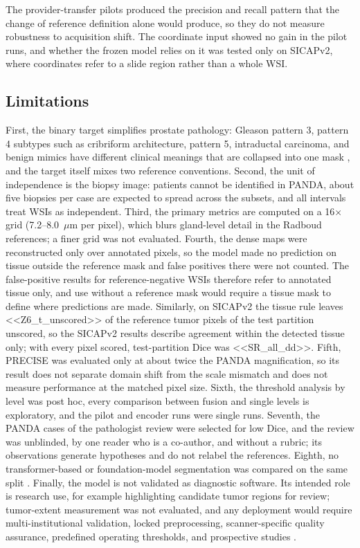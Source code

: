 \documentclass[10pt,letterpaper]{article}
\begin{document}
The provider-transfer pilots produced the precision and recall pattern that the change of reference definition alone would produce, so they do not measure robustness to acquisition shift. The coordinate input showed no gain in the pilot runs, and whether the frozen model relies on it was tested only on SICAPv2, where coordinates refer to a slide region rather than a whole WSI.

\subsection*{Limitations}
First, the binary target simplifies prostate pathology: Gleason pattern 3, pattern 4 subtypes such as cribriform architecture, pattern 5, intraductal carcinoma, and benign mimics have different clinical meanings that are collapsed into one mask \cite{bib3,bib4,bib5}, and the target itself mixes two reference conventions. Second, the unit of independence is the biopsy image: patients cannot be identified in PANDA, about five biopsies per case are expected to spread across the subsets, and all intervals treat WSIs as independent. Third, the primary metrics are computed on a 16$\times$ grid (7.2--8.0~$\mu$m per pixel), which blurs gland-level detail in the Radboud references; a finer grid was not evaluated. Fourth, the dense maps were reconstructed only over annotated pixels, so the model made no prediction on tissue outside the reference mask and false positives there were not counted. The false-positive results for reference-negative WSIs therefore refer to annotated tissue only, and use without a reference mask would require a tissue mask to define where predictions are made. Similarly, on SICAPv2 the tissue rule leaves <<Z6_t_unscored>> of the reference tumor pixels of the test partition unscored, so the SICAPv2 results describe agreement within the detected tissue only; with every pixel scored, test-partition Dice was <<SR_all_dd>>. Fifth, PRECISE was evaluated only at about twice the PANDA magnification, so its result does not separate domain shift from the scale mismatch and does not measure performance at the matched pixel size. Sixth, the threshold analysis by level was post hoc, every comparison between fusion and single levels is exploratory, and the pilot and encoder runs were single runs. Seventh, the PANDA cases of the pathologist review were selected for low Dice, and the review was unblinded, by one reader who is a co-author, and without a rubric; its observations generate hypotheses and do not relabel the references. Eighth, no transformer-based or foundation-model segmentation was compared on the same split \cite{bib48,bib49,bib50,bib57,bib58}. Finally, the model is not validated as diagnostic software. Its intended role is research use, for example highlighting candidate tumor regions for review; tumor-extent measurement was not evaluated, and any deployment would require multi-institutional validation, locked preprocessing, scanner-specific quality assurance, predefined operating thresholds, and prospective studies \cite{bib51,bib52}.
\end{document}
